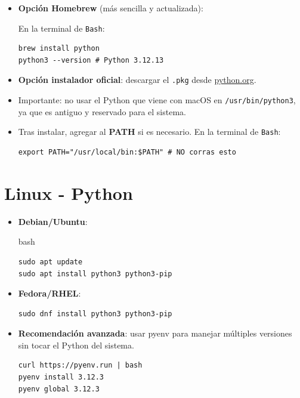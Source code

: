 \documentclass[
  spanish,
  12pt,
  letterpaper,
  DIV=11,
  numbers=noendperiod]{scrreprt}
\begin{document}
\begin{itemize}
\item
  \textbf{Opción Homebrew} (más sencilla y actualizada):

  En la terminal de \texttt{Bash}:

\begin{verbatim}
brew install python
python3 --version # Python 3.12.13
\end{verbatim}
\item
  \textbf{Opción instalador oficial}: descargar el \texttt{.pkg} desde
  \href{https://www.python.org/downloads/mac-osx/}{python.org}.
\item
  Importante: no usar el Python que viene con macOS en
  \texttt{/usr/bin/python3}, ya que es antiguo y reservado para el
  sistema.
\item
  Tras instalar, agregar al \textbf{PATH} si es necesario. En la
  terminal de \texttt{Bash}:

\begin{verbatim}
export PATH="/usr/local/bin:$PATH" # NO corras esto
\end{verbatim}
\end{itemize}

\section{Linux - Python}\label{linux---python}

\begin{itemize}
\item
  \textbf{Debian/Ubuntu}:

  bash

\begin{verbatim}
sudo apt update
sudo apt install python3 python3-pip
\end{verbatim}
\item
  \textbf{Fedora/RHEL}:

\begin{verbatim}
sudo dnf install python3 python3-pip
\end{verbatim}
\item
  \textbf{Recomendación avanzada}: usar pyenv para manejar múltiples
  versiones sin tocar el Python del sistema.

\begin{verbatim}
curl https://pyenv.run | bash
pyenv install 3.12.3
pyenv global 3.12.3
\end{verbatim}
\end{itemize}
\end{document}

